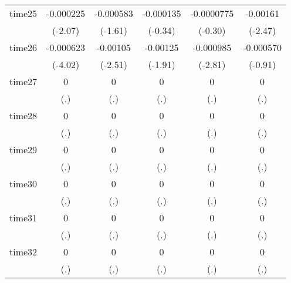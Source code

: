 \begin{table}[htbp]
\begin{tabular}{l*{5}{c}}
time25      &   -0.000225\sym{*}  &   -0.000583         &   -0.000135         &  -0.0000775         &    -0.00161\sym{*}  \\
            &     (-2.07)         &     (-1.61)         &     (-0.34)         &     (-0.30)         &     (-2.47)         \\
time26      &   -0.000623\sym{***}&    -0.00105\sym{*}  &    -0.00125         &   -0.000985\sym{**} &   -0.000570         \\
            &     (-4.02)         &     (-2.51)         &     (-1.91)         &     (-2.81)         &     (-0.91)         \\
time27      &           0         &           0         &           0         &           0         &           0         \\
            &         (.)         &         (.)         &         (.)         &         (.)         &         (.)         \\
time28      &           0         &           0         &           0         &           0         &           0         \\
            &         (.)         &         (.)         &         (.)         &         (.)         &         (.)         \\
time29      &           0         &           0         &           0         &           0         &           0         \\
            &         (.)         &         (.)         &         (.)         &         (.)         &         (.)         \\
time30      &           0         &           0         &           0         &           0         &           0         \\
            &         (.)         &         (.)         &         (.)         &         (.)         &         (.)         \\
time31      &           0         &           0         &           0         &           0         &           0         \\
            &         (.)         &         (.)         &         (.)         &         (.)         &         (.)         \\
time32      &           0         &           0         &           0         &           0         &           0         \\
            &         (.)         &         (.)         &         (.)         &         (.)         &         (.)         \\

\end{tabular}
\end{table}
